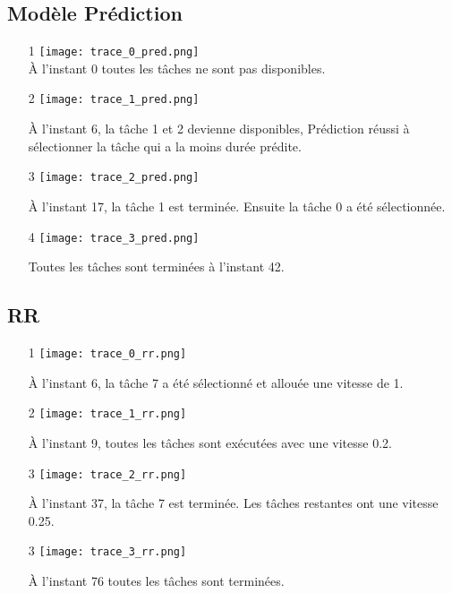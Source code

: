\documentclass[12pt]{article}
\begin{document}
    \subsection{Modèle Prédiction}
    \begin{itemize}
        \item[1]\texttt{[image: trace\_0\_pred.png]} \\
        À l'instant 0 toutes les tâches ne sont pas disponibles.
        
        \item[2]\texttt{[image: trace\_1\_pred.png]}
        
        À l'instant 6, la tâche 1 et 2 devienne disponibles, Prédiction réussi à sélectionner la tâche qui a la moins durée prédite.
        
        \item[3] \texttt{[image: trace\_2\_pred.png]} 
        
        À l'instant 17, la tâche 1 est terminée. Ensuite la tâche 0 a été sélectionnée.
        
        \item[4]  \texttt{[image: trace\_3\_pred.png]}
        
        Toutes les tâches sont terminées à l'instant 42.
    
    \end{itemize}
    
    \subsection{RR}
    \begin{itemize}
        \item[1]\texttt{[image: trace\_0\_rr.png]}
        
        À l'instant 6, la tâche 7 a été sélectionné et allouée une vitesse de 1.
        
        \item[2]\texttt{[image: trace\_1\_rr.png]}
        
        À l'instant 9, toutes les tâches sont exécutées avec une vitesse 0.2.
        
        \item[3]\texttt{[image: trace\_2\_rr.png]}
        
        À l'instant 37, la tâche 7 est terminée. Les tâches restantes ont une vitesse 0.25.
        
        \item[3]\texttt{[image: trace\_3\_rr.png]}
        
        À l'instant 76 toutes les tâches sont terminées.
        
    \end{itemize}
\end{document}
